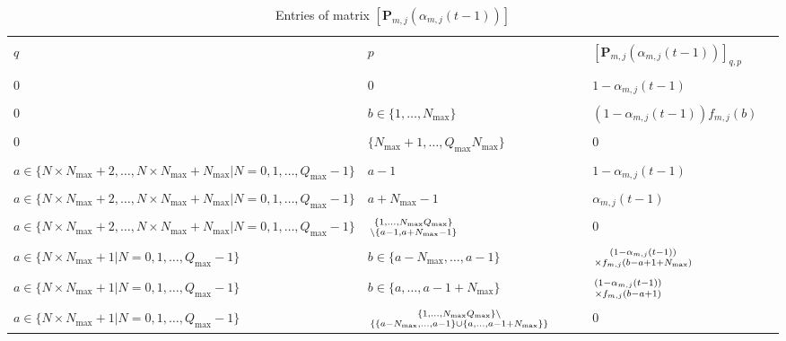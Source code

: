 \begin{table*}
    \centering
    \caption{Entries of matrix $[\mathbf{P}_{m,j}(\alpha_{m,j}(t-1))]$}
    \label{table:P}
    \begin{tabular}{ |p{0.40\linewidth}|p{0.33\linewidth}|p{0.27\linewidth}| }
        \hline
        & & \\[-6pt]
        $q$ & $p$ & $[\mathbf{P}_{m,j}(\alpha_{m,j}(t-1))]_{q,p}$\\
        \hline
        & & \\[-6pt]
        $0$&$0$&$1-\alpha_{m,j}(t-1)$\\  %
        \hline
        & & \\[-6pt]
        $0$ & $b\in\{1,\dots,N_{{\max}}\}$ & $(1-\alpha_{m,j}(t-1))f_{m,j}(b)$\\  %
        \hline
            & & \\[-6pt]
        $0$&$\{N_{{\max}}+1,\dots,Q_{{\max}}N_{{\max}}\}$&$0$\\  %
        \hline
            & & \\[-6pt]
        $a\in\{N\times N_{{\max}}+2,\dots,N\times N_{{\max}}+N_{{\max}}|N=0,1,\dots,Q_{{\max}}-1\}$&$a-1$&$1-\alpha_{m,j}(t-1)$\\  %
        \hline
        & & \\[-6pt]
        $a\in\{N\times N_{{\max}}+2,\dots,N\times N_{{\max}}+N_{{\max}}|N=0,1,\dots,Q_{{\max}}-1\}$&$a+N_{{\max}}-1$&$\alpha_{m,j}(t-1)$\\  %
        \hline
        & & \\[-6pt]
        $a\in\{N\times N_{{\max}}+2,\dots,N\times N_{{\max}}+N_{{\max}}|N=0,1,\dots,Q_{{\max}}-1\}$&${\{1,\dots,N_{{\max}}Q_{{\max}}\}\atop\setminus\{a-1,a+N_{{\max}}-1\}}$&$0$\\  %
        \hline
            & & \\[-6pt]
        $a\in\{N\times N_{{\max}}+1|N=0,1,\dots,Q_{{\max}}-1\}$&$b\in\{a-N_{{\max}},\dots,a-1\}$&${(1-\alpha_{m,j}(t-1))\atop\times f_{m,j}(b-a+1+N_{{\max}})}$\\  %
        \hline
            & & \\[-6pt]
        $a\in\{N\times N_{{\max}}+1|N=0,1,\dots,Q_{{\max}}-1\}$&$b\in\{a,\dots,a-1+N_{{\max}}\}$&${(1-\alpha_{m,j}(t-1))\atop\times f_{m,j}(b-a+1)}$\\  %
        \hline
            & & \\[-6pt]
        $a\in\{N\times N_{{\max}}+1|N=0,1,\dots,Q_{{\max}}-1\}$&${\{1,\dots,N_{{\max}}Q_{{\max}}\}\setminus\atop\{\{a-N_{{\max}},\dots,a-1\}\cup \{a,\dots,a-1+N_{{\max}}\}\}}$&$0$\\  %
        \hline
    \end{tabular}
\end{table*}


